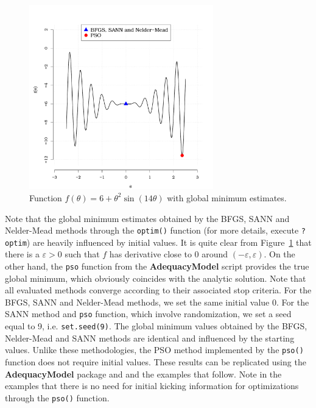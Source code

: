 \documentclass[10pt,letterpaper]{article}
\begin{document}
\begin{figure}[H]
    \centering
	\includegraphics[width=8cm,height=8cm]{plot_f}
	\caption{Function $f(\theta) = 6 + \theta^2 \sin(14\theta)$ with global minimum estimates.}
	\label{fig:f}
\end{figure}

Note that the global minimum estimates obtained by the BFGS, SANN and Nelder-Mead methods through the \texttt{optim()} function (for more details, execute \texttt{?optim}) are heavily influenced by initial values. It is quite clear from Figure~\ref{fig:f} that there is a $\varepsilon >0$
such that $f$ has derivative close to 0 around $(-\varepsilon, \varepsilon)$. On the other hand, the \texttt{pso} function from the
\textbf{AdequacyModel} script provides the true global minimum, which obviously coincides with the analytic solution.
Note that all evaluated methods converge according to their associated stop criteria. For the BFGS, SANN and Nelder-Mead methods, we set the same initial
value 0. For the SANN method and \texttt{pso} function, which involve randomization, we set a seed equal to 9, i.e. \texttt{set.seed(9)}.
The global minimum values obtained by the BFGS, Nelder-Mead and SANN methods are identical and influenced by the starting values.
Unlike these methodologies, the PSO method implemented by the \texttt{pso()} function does not require initial values.
These results can be replicated using the \textbf{AdequacyModel} package and and the examples that follow. Note in the examples that there is no need for initial kicking information for optimizations through the \texttt{pso()} function.
\end{document}
